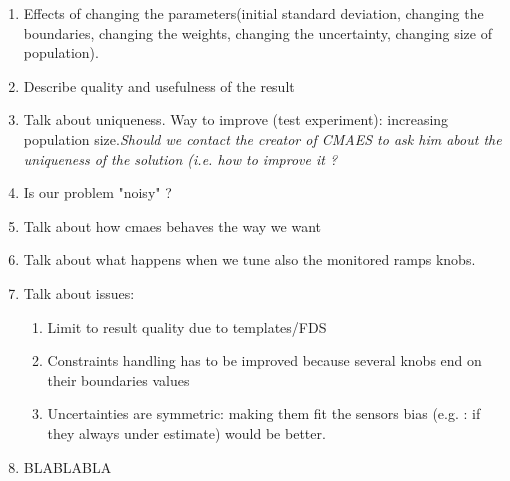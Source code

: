 \begin{enumerate}
	\item Effects of changing the parameters(initial standard deviation, changing the boundaries, changing the weights, changing the uncertainty, changing size of population).
	\item Describe quality and usefulness of the result
	\item Talk about uniqueness. Way to improve (test experiment): increasing population size.\emph{Should we contact the creator of CMAES to ask him about the uniqueness of the solution (i.e. how to improve it ?}
	\item Is our problem "noisy" ?
	\item Talk about how cmaes behaves the way we want
	\item Talk about what happens when we tune also the monitored ramps knobs.	
	\item Talk about issues:
\begin{enumerate}
	\item Limit to result quality due to templates/FDS
	\item Constraints handling has to be improved because several knobs end on their boundaries values\
	\item Uncertainties are symmetric: making them fit the sensors bias (e.g. : if they always under estimate) would be better.
\end{enumerate}
	\item BLABLABLA
\end{enumerate} 
